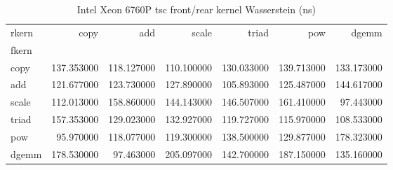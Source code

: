 \begin{table}
\caption{Intel Xeon 6760P tsc front/rear kernel Wasserstein (ns)}
\begin{tabular}{lrrrrrr}
\toprule
rkern & copy & add & scale & triad & pow & dgemm \\
fkern &  &  &  &  &  &  \\
\midrule
copy & 137.353000 & 118.127000 & 110.100000 & 130.033000 & 139.713000 & 133.173000 \\
add & 121.677000 & 123.730000 & 127.890000 & 105.893000 & 125.487000 & 144.617000 \\
scale & 112.013000 & 158.860000 & 144.143000 & 146.507000 & 161.410000 & 97.443000 \\
triad & 157.353000 & 129.023000 & 132.927000 & 119.727000 & 115.970000 & 108.533000 \\
pow & 95.970000 & 118.077000 & 119.300000 & 138.500000 & 129.877000 & 178.323000 \\
dgemm & 178.530000 & 97.463000 & 205.097000 & 142.700000 & 187.150000 & 135.160000 \\
\bottomrule
\end{tabular}
\end{table}
